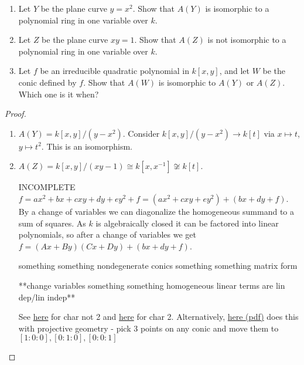 \label{0.1.1}

\begin{enumerate}[label = (\alph*)]
    \item Let $Y$ be the plane curve $y = x^2$. Show that $A(Y)$ is isomorphic to a polynomial ring in one variable over $k$.
    
    \item Let $Z$ be the plane curve $xy = 1$. Show that $A(Z)$ is not isomorphic to a polynomial ring in one variable over $k$.
    
    \item Let $f$ be an irreducible quadratic polynomial in $k[x, y]$, and let $W$ be the conic defined by $f$. Show that $A(W)$ is isomorphic to $A(Y)$ or $A(Z)$. Which one is it when?
\end{enumerate}

\begin{proof}
    \begin{enumerate}[label = (\alph*)]
        \item $A(Y) = k[x, y]/(y - x^2)$. Consider $k[x, y]/(y - x^2) \longrightarrow k[t]$ via $x \mapsto t$, $y \mapsto t^2$. This is an isomorphism.
        
        \item $A(Z) = k[x, y]/(xy - 1) \cong k[x, x^{-1}] \not\cong k[t]$.
        
        \item[INCOMPLETE] $f = ax^2 + bx + cxy + dy + ey^2 + f = (ax^2 + cxy + ey^2) + (bx + dy + f)$. By a change of variables we can diagonalize the homogeneous summand to a sum of squares. As $k$ is algebraically closed it can be factored into linear polynomials, so after a change of variables we get $f = (Ax + By)(Cx + Dy) + (bx + dy + f)$.
        
        something something nondegenerate conics something something matrix form
        
        **change variables something something homogeneous linear terms are lin dep/lin indep**

        See \href{https://math.stackexchange.com/questions/1200983/irreducible-conics/1201595}{here} for char not 2 and \href{https://math.stackexchange.com/questions/532289/conics-over-fields-of-characteristic-two}{here} for char 2. Alternatively, \href{https://math.berkeley.edu/~reb/courses/256A/1.1.pdf}{here (pdf)} does this with projective geometry - pick 3 points on any conic and move them to $[1 : 0 : 0], [0 : 1 : 0], [0 : 0 : 1]$
    \end{enumerate}
\end{proof}
